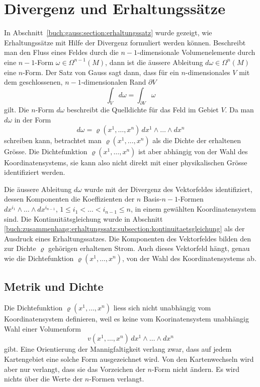 %
%
%

%
%
\section{Divergenz und Erhaltungssätze
\label{buch:zusammenhang:section:divergenz}}
In Abschnitt~\ref{buch:gauss:section:erhaltungssatz} wurde gezeigt,
wie Erhaltungssätze mit Hilfe der Divergenz formuliert werden können.
Beschreibt man den Fluss eines Feldes durch die $n-1$-dimensionale
Volumenelemente durch eine $n-1$-Form $\omega\in \Omega^{n-1}(M)$,
dann ist die äussere Ableitung $d\omega\in \Omega^n(M)$ eine $n$-Form.
Der Satz von Gauss sagt dann, dass für ein $n$-dimensionales $V$
mit dem geschlossenen, $n-1$-dimensionalen Rand $\partial V$
\[
\int_{V}d\omega
=
\int_{\partial V}\omega
\]
gilt.
Die $n$-Form $d\omega$ beschreibt die Quelldichte für das Feld im
Gebiet $V$.
Da man $d\omega$ in der Form
\[
d\omega
=
\varrho(x^1,\dots,x^n)
\,
dx^1\wedge\dots\wedge dx^n
\]
schreiben kann, betrachtet man $\varrho(x^1,\dots,x^n)$ als die
Dichte der erhaltenen Grösse.
Die Dichtefunktion $\varrho(x^1,\dots,x^n)$  ist aber abhängig
von der Wahl des Koordinatensystems, sie kann also nicht direkt 
mit einer physikalischen Grösse identifiziert werden.

Die äussere Ableitung $d\omega$ wurde mit der Divergenz des Vektorfeldes
identifiziert, dessen Komponenten die Koeffizienten der $n$ Basis-$n-1$-Formen
$dx^{i_1}\wedge\dots\wedge dx^{i_{n-1}}$, $1\le i_1<\dots<i_{n-1}\le n$, in
einem gewählten Koordinatensystem sind.
Die Kontinuitätsgleichung wurde in Abschnitt
\ref{buch:zusammenhang:erhaltungssatz:subsection:kontinuitaetsgleichung}
als der Ausdruck eines Erhaltungssatzes.
Die Komponenten des Vektorfeldes bilden den zur Dichte $\varrho$ gehörigen
erhaltenen Strom.
Auch dieses Vektorfeld hängt, genau wie die Dichtefunktion
$\varrho(x^1,\dots,x^n)$, von der Wahl des Koordinatensystems ab.

%
%
\subsection{Metrik und Dichte
\label{buch:zusammenhang:divergenz:subsection:metrik}}
Die Dichtefunktion $\varrho(x^1,\dots,x^n)$ liess sich nicht 
unabhängig vom Koordinatensystem definieren, weil es keine vom
Koorinatensystem unabhängig Wahl einer Volumenform
\[
v(x^1,\dots,x^n)\,dx^1\wedge\dots\wedge dx^n
\]
gibt.
Eine Orientierung der Mannigfaltigkeit verlang zwar, dass auf
jedem Kartengebiet eine solche Form ausgezeichnet wird.
Von den Kartenwechseln wird aber nur verlangt, dass sie das Vorzeichen
der $n$-Form nicht ändern.
Es wird nichts über die Werte der $n$-Formen verlangt.

